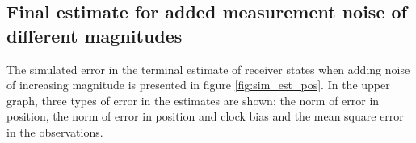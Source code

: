 \subsection{Final estimate for added measurement noise of different magnitudes}
The simulated error in the terminal estimate of receiver states when adding noise of increasing magnitude is presented in figure \ref{fig:sim_est_pos}. In the upper graph, three types of error in the estimates are shown: the norm of error in position, the norm of error in position and clock bias and the mean square error in the observations.
